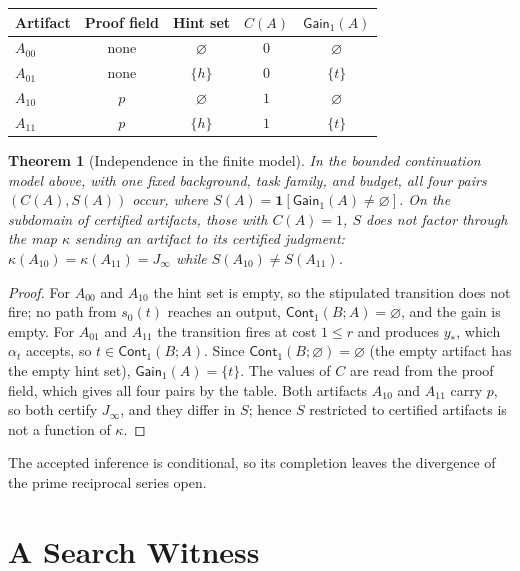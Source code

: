 \documentclass[11pt]{book}
\newtheorem{theorem}{Theorem}[chapter]
\theoremstyle{definition}
\theoremstyle{remark}
\newcommand{\Cont}{\mathsf{Cont}}
\newcommand{\Gain}{\mathsf{Gain}}
\newcommand{\cert}{\kappa}
\begin{document}
\begin{center}
\begin{tabular}{lcccc}
\toprule
Artifact & Proof field & Hint set & $C(A)$ & $\Gain_1(A)$\\
\midrule
$A_{00}$ & none & $\varnothing$ & $0$ & $\varnothing$\\
$A_{01}$ & none & $\{h\}$ & $0$ & $\{t\}$\\
$A_{10}$ & $p$ & $\varnothing$ & $1$ & $\varnothing$\\
$A_{11}$ & $p$ & $\{h\}$ & $1$ & $\{t\}$\\
\bottomrule
\end{tabular}
\end{center}

\begin{theorem}[Independence in the finite model]\label{thm:finite}
In the bounded continuation model above, with one fixed background, task family, and budget, all four pairs $(C(A),S(A))$ occur, where $S(A)=\mathbf 1[\Gain_1(A)\ne\varnothing]$. On the subdomain of certified artifacts, those with $C(A)=1$, $S$ does not factor through the map $\cert$ sending an artifact to its certified judgment: $\cert(A_{10})=\cert(A_{11})=J_\infty$ while $S(A_{10})\ne S(A_{11})$.
\end{theorem}

\begin{proof}
For $A_{00}$ and $A_{10}$ the hint set is empty, so the stipulated transition does not fire; no path from $s_0(t)$ reaches an output, $\Cont_1(B;A)=\varnothing$, and the gain is empty. For $A_{01}$ and $A_{11}$ the transition fires at cost $1\le r$ and produces $y_\ast$, which $\alpha_t$ accepts, so $t\in\Cont_1(B;A)$. Since $\Cont_1(B;\varnothing)=\varnothing$ (the empty artifact has the empty hint set), $\Gain_1(A)=\{t\}$. The values of $C$ are read from the proof field, which gives all four pairs by the table. Both artifacts $A_{10}$ and $A_{11}$ carry $p$, so both certify $J_\infty$, and they differ in $S$; hence $S$ restricted to certified artifacts is not a function of $\cert$.
\end{proof}

The accepted inference is conditional, so its completion leaves the divergence of the prime reciprocal series open. \section*{A Search Witness}
\end{document}
